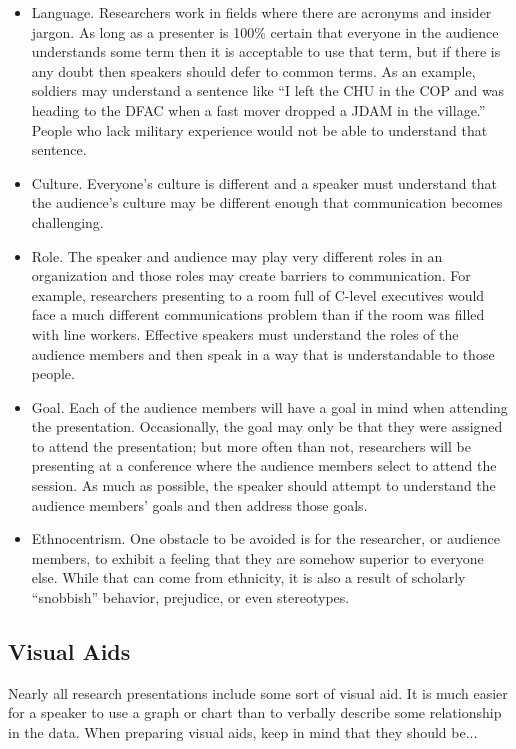 \begin{itemize}
	\item Language. Researchers work in fields where there are acronyms and insider jargon. As long as a presenter is 100\% certain that everyone in the audience understands some term then it is acceptable to use that term, but if there is any doubt then speakers should defer to common terms. As an example, soldiers may understand a sentence like ``I left the CHU in the COP and was heading to the DFAC when a fast mover dropped a JDAM in the village.'' People who lack military experience would not be able to understand that sentence.
	\item Culture. Everyone's culture is different and a speaker must understand that the audience's culture may be different enough that communication becomes challenging.
	\item Role. The speaker and audience may play very different roles in an organization and those roles may create barriers to communication. For example, researchers presenting to a room full of C-level executives would face a much different communications problem than if the room was filled with line workers. Effective speakers must understand the roles of the audience members and then speak in a way that is understandable to those people.
	\item Goal. Each of the audience members will have a goal in mind when attending the presentation. Occasionally, the goal may only be that they were assigned to attend the presentation; but more often than not, researchers will be presenting at a conference where the audience members select to attend the session. As much as possible, the speaker should attempt to understand the audience members' goals and then address those goals.
	\item Ethnocentrism. One obstacle to be avoided is for the researcher, or audience members, to exhibit a feeling that they are somehow superior to everyone else. While that can come from ethnicity, it is also a result of scholarly ``snobbish'' behavior, prejudice, or even stereotypes.
\end{itemize}

\subsection{Visual Aids}

Nearly all research presentations include some sort of visual aid. It is much easier for a speaker to use a graph or chart than to verbally describe some relationship in the data. When preparing visual aids, keep in mind that they should be...

